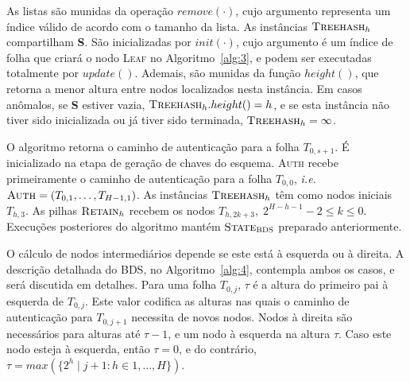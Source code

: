 \documentclass[12pt,notitlepage]{report}
\begin{document}
As listas são munidas da operação $remove(\cdot)$, cujo argumento representa um índice válido de acordo com o tamanho da lista. As instâncias $\textsc{Treehash}_{h}$ compartilham \textbf{S}. São inicializadas por $init(\cdot)$, cujo argumento é um índice de folha que criará o nodo \textsc{Leaf} no Algoritmo~\ref{alg:3}, e podem ser executadas totalmente por $update()$. Ademais, são munidas da função $height()$, que retorna a menor altura entre nodos localizados nesta instância. Em casos anômalos, se \textbf{S} estiver vazia, $\textsc{Treehash}_{h}.height() = h$, e se esta instância não tiver sido inicializada ou já tiver sido terminada, $\textsc{Treehash}_{h} = \infty$.

O algoritmo retorna o caminho de autenticação para a folha $T_{0, s + 1}$. É inicializado na etapa de geração de chaves do esquema. \textsc{Auth} recebe primeiramente o caminho de autenticação para a folha $T_{0, 0}$, \emph{i.e.} $\textsc{Auth} = (T_{0, 1}, \dots, T_{H -1, 1})$. As instâncias $\textsc{Treehash}_{h}$ têm como nodos iniciais $T_{h, 3}$. As pilhas $\textsc{Retain}_{h}$ recebem os nodos $T_{h, 2k + 3}, \; 2^{H - h - 1} - 2 \leq k \leq 0$. Execuções posteriores do algoritmo mantém $\textsc{State}_{\textsc{BDS}}$ preparado anteriormente.

O cálculo de nodos intermediários depende se este está à esquerda ou à direita. A descrição detalhada do  BDS, no Algoritmo~\ref{alg:4}, contempla ambos os casos, e será discutida em detalhes. Para uma folha $T_{0, j}$, $\tau$ é a altura do primeiro pai à esquerda de $T_{0, j}$. Este valor codifica as alturas nas quais o caminho de autenticação para $T_{0, j + 1}$ necessita de novos nodos. Nodos à direita são necessários para alturas até $\tau - 1$, e um nodo à esquerda na altura $\tau$. Caso este nodo esteja à esquerda, então $\tau = 0$, e do contrário, $\tau = max(\{2^h \mid j + 1 : h \in 1, \dots, H\})$.
\end{document}
